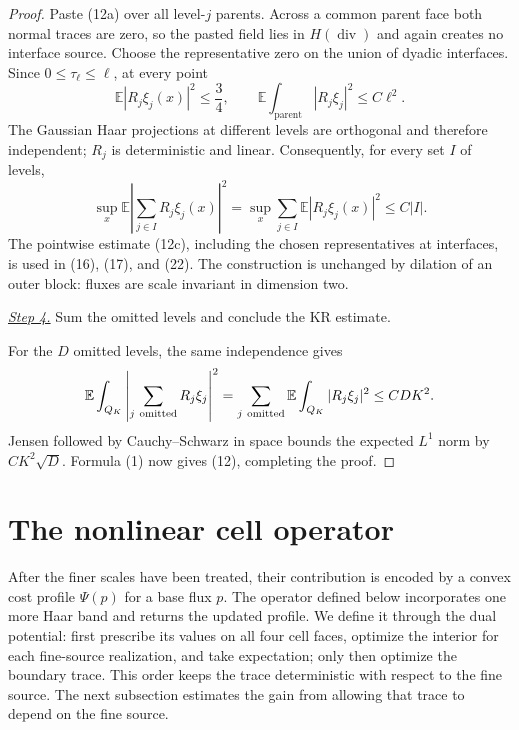 \documentclass{smfart}
\theoremstyle{definition}
\newcommand{\1}{\mathbf 1}
\begin{document}
\begin{proof}
Paste (12a) over all level-$j$ parents.  Across a common parent face both
normal traces are zero, so the pasted field lies in
$H(\operatorname {div})$ and again creates no interface source.  Choose
the representative zero on the union of dyadic interfaces.  Since
$0\leq\tau_ \ell\leq\ell$, at every point
\begin{equation}
\mathbb E|R_ j\xi_ j(x)|^2\leq \frac34,\qquad
\mathbb E\int_ {\text{parent}}|R_ j\xi_ j|^2\leq C\ell^2.
\tag{12b}
\end{equation}
The Gaussian Haar projections at different levels are orthogonal and
therefore independent; $R_ j$ is deterministic and linear.  Consequently,
for every set $I$ of levels,
\begin{equation}
\sup_ x\mathbb E\left|\sum_ {j\in I}R_ j\xi_ j(x)\right|^2
=\sup_ x\sum_ {j\in I}\mathbb E|R_ j\xi_ j(x)|^2
\leq C|I|.
\tag{12c}
\end{equation}
The pointwise estimate (12c), including the chosen representatives at
interfaces, is used in (16), (17), and (22).  The construction is unchanged
by dilation of an outer block: fluxes are scale invariant in dimension two.

\smallskip\noindent
\underline{\textit{Step 4.}} Sum the omitted levels and conclude the KR estimate.

For the $D$ omitted levels, the same independence gives
\begin{equation*}
\mathbb E\int_ {Q_ K}\left|\sum_ {j\ {\rm omitted}}R_ j\xi_ j\right|^2
=\sum_ {j\ {\rm omitted}}\mathbb E\int_ {Q_ K}|R_ j\xi_ j|^2
\leq CDK^2.
\end{equation*}
Jensen followed by Cauchy--Schwarz in space bounds the expected
$L^1$ norm by $CK^2\sqrt D$.  Formula (1) now gives (12), completing
the proof.

\end{proof}

\section{The nonlinear cell operator}\label{sec:cell-operator}

After the finer scales have been treated, their contribution is encoded
by a convex cost profile $\Psi(p)$ for a base flux $p$.  The operator
defined below incorporates one more Haar band and returns the updated
profile.  We define it through the dual potential: first prescribe its
values on all four cell faces, optimize the interior for each fine-source
realization, and take expectation; only then optimize the boundary trace.
This order keeps the trace deterministic with respect to the fine source.
The next subsection estimates the gain from allowing that trace to depend
on the fine source.
\end{document}
